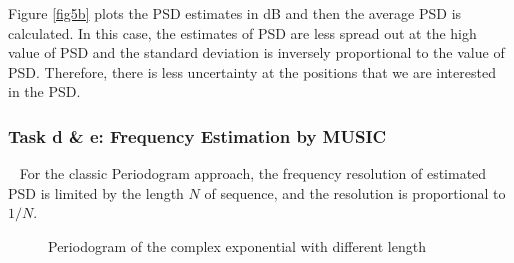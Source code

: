 \documentclass[10pt]{article}
\begin{document}
Figure \ref{fig5b} plots the PSD estimates in dB and then the average PSD 
is calculated. In this case, the estimates of PSD are less spread out at 
the high value of PSD and the standard deviation is inversely proportional 
to the value of PSD. Therefore, there is less uncertainty at the positions 
that we are interested in the PSD.

\subsubsection{Task d \& e: Frequency Estimation by MUSIC}
\ \indent
For the classic Periodogram approach, the frequency 
resolution of estimated PSD is limited by the length $N$ of sequence, 
and the resolution is proportional to $1/N$. 

\begin{figure}[htbp]
    \centering
    \caption{Periodogram of the complex exponential with different length}
    \label{fig6}
\end{figure}
\end{document}

